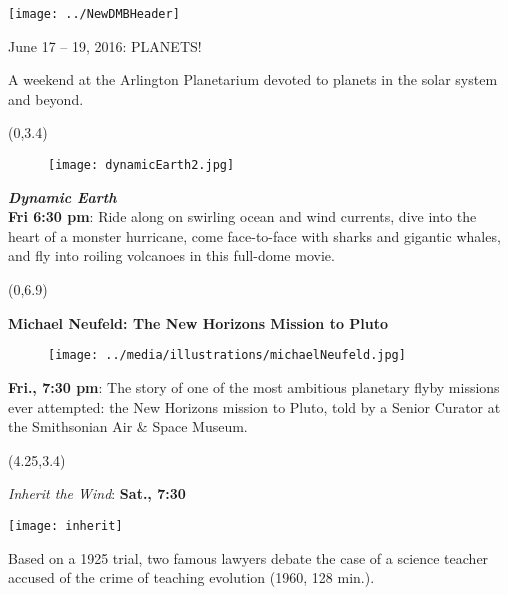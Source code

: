 \documentclass{article}
\begin{document}
\texttt{[image: ../NewDMBHeader]}
   \begin{centering}
     {\fontsize{28}{8}
  
        June 17 – 19, 2016: PLANETS!
     }

     {\fontsize{19}{19}
      
        A weekend at the Arlington Planetarium devoted to 
        planets in the solar system and beyond.

     }
  
   \end{centering}
   

\begin{textblock}{4}(0,3.4)
   \begin{wrapfigure}[9]{l}{1.8in}
     \texttt{[image: dynamicEarth2.jpg]}
   \end{wrapfigure}      

     {\fontsize{20}{22}
      \textbf{\textit{Dynamic Earth}\\ Fri  6:30 pm}: Ride along on swirling ocean and wind currents, dive into the heart of a monster hurricane, come face-to-face with sharks and gigantic whales, and fly into roiling volcanoes in this full-dome movie.

       }
       

\end{textblock}

\begin{textblock}{4}(0,6.9)

   {\fontsize{20}{21}

   \textbf{Michael Neufeld: The New Horizons Mission to Pluto}
   \begin{wrapfigure}{r}{1.1in}
      \texttt{[image: ../media/illustrations/michaelNeufeld.jpg]}
   \end{wrapfigure}      
   
   \textbf{Fri., 7:30 pm}:
      The story of one of the most ambitious planetary flyby missions ever attempted: the New Horizons mission to Pluto,
      told by a Senior Curator at the Smithsonian Air & Space Museum.

   }

\end{textblock}

\begin{textblock}{3.85}(4.25,3.4)
   {\fontsize{18}{20}

   \begin{centering}

     \textit{Inherit the Wind}:
     \textbf{Sat.,  7:30}


   \texttt{[image: inherit]}

   \end{centering}

Based on a 1925 trial, two famous law\-yers debate the case of a science teacher accused of the crime of teaching evolution (1960, 128 min.).

   }
\end{textblock}
\end{document}

